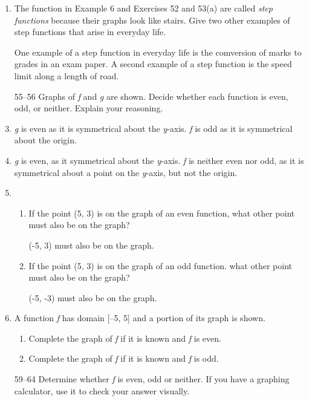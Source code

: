 \documentclass{article}
\begin{document}
\begin{enumerate}
	\item The function in Example 6 and Exercises 52 and 53(a) are called \emph{step functions} because
		their graphs look like stairs. Give two other examples of step functions that arise in everyday life.
		
		One example of a step function in everyday life is the comversion of marks to grades in an exam
		paper. A second example of a step function is the speed limit along a length of road.
		
	\item[55--56] Graphs of \emph{f} and \emph{g} are shown. Decide whether each function is even, 
		odd, or neither. Explain your reasoning.
		
	\item \emph{g} is even as it is symmetrical about the \emph{y}-axis. \emph{f} is odd as it is symmetrical
		about the origin.
		
	\item \emph{g} is even, as it symmetrical about the \emph{y}-axis. \emph{f} is neither even nor odd, as
		it is symmetrical about a point on the \emph{y}-axis, but not the origin.
		
	\item
		\begin{enumerate}
			\item If the point (5, 3) is on the graph of an even function, what other point must also
				be on the graph?
				
				(-5, 3) must also be on the graph.
				
			\item If the point (5, 3) is on the graph of an odd function. what other point must also
				be on the graph?
				
				(-5, -3) must also be on the graph.
				
		\end{enumerate}

	\item A function \emph{f} has domain [--5, 5] and a portion of its graph is shown.
		\begin{enumerate}
			\item Complete the graph of \emph{f} if it is known and \emph{f} is even.
			
			\item Complete the graph of \emph{f} if it is known and \emph{f} is odd.
		\end{enumerate}
		
	\item[59--64] Determine whether \emph{f} is even, odd or neither. If you have a graphing calculator,
		use it to check your answer visually.
		

\end{enumerate}
\end{document}
